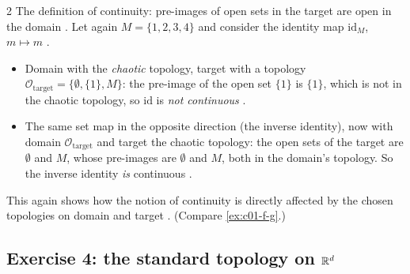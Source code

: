 \begin{paracol}{2}
The definition of continuity: pre-images of open sets in the target are open in the domain . Let again $M=\{1,2,3,4\}$ and consider the identity map $\mathrm{id}_M$, $m\mapsto m$
.
\begin{itemize}
  \item Domain with the \emph{chaotic} topology, target with a topology $\mathcal O_{\mathrm{target}}=\{\emptyset,\{1\},M\}$: the pre-image of the open set $\{1\}$ is $\{1\}$, which is not in the chaotic
        topology, so $\mathrm{id}$ is \emph{not continuous} .
  \item The same set map in the opposite direction (the inverse identity), now with domain $\mathcal O_{\mathrm{target}}$ and target the chaotic topology: the open sets of the target are $\emptyset$ and $M$, whose
        pre-images are $\emptyset$ and $M$, both in the domain's topology. So the inverse identity \emph{is} continuous .
\end{itemize}
This again shows how the notion of continuity is directly affected by the chosen topologies on domain and target . (Compare \cref{ex:c01-f-g}.)

\subsection*{Exercise 4: the standard topology on \texorpdfstring{$\mathbb{R}^d$}{Rd}}


\end{paracol}
